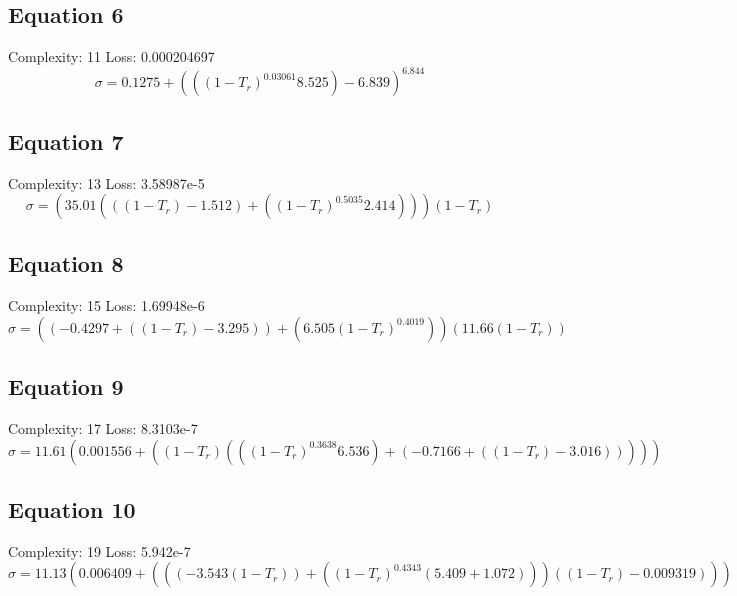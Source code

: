 \documentclass[11pt]{article}
\begin{document}
\subsection*{Equation 6}
\noindent Complexity: 11 \quad Loss: 0.000204697 \\[4pt]
\[
\sigma = 0.1275 + \left((\left(1 - T_r\right)^{0.03061} 8.525) - 6.839\right)^{6.844}
\]

\subsection*{Equation 7}
\noindent Complexity: 13 \quad Loss: 3.58987e-5 \\[4pt]
\[
\sigma = (35.01 (((1 - T_r) -1.512) + (\left(1 - T_r\right)^{0.5035} 2.414))) (1 - T_r)
\]

\subsection*{Equation 8}
\noindent Complexity: 15 \quad Loss: 1.69948e-6 \\[4pt]
\[
\sigma = ((-0.4297 + ((1 - T_r) -3.295)) + (6.505 \left(1 - T_r\right)^{0.4019})) (11.66 (1 - T_r))
\]

\subsection*{Equation 9}
\noindent Complexity: 17 \quad Loss: 8.3103e-7 \\[4pt]
\[
\sigma = 11.61 (0.001556 + ((1 - T_r) ((\left(1 - T_r\right)^{0.3638} 6.536) + (-0.7166 + ((1 - T_r) -3.016)))))
\]

\subsection*{Equation 10}
\noindent Complexity: 19 \quad Loss: 5.942e-7 \\[4pt]
\[
\sigma = 11.13 (0.006409 + (((-3.543 (1 - T_r)) + (\left(1 - T_r\right)^{0.4343} (5.409 + 1.072))) ((1 - T_r) - 0.009319)))
\]
\end{document}
